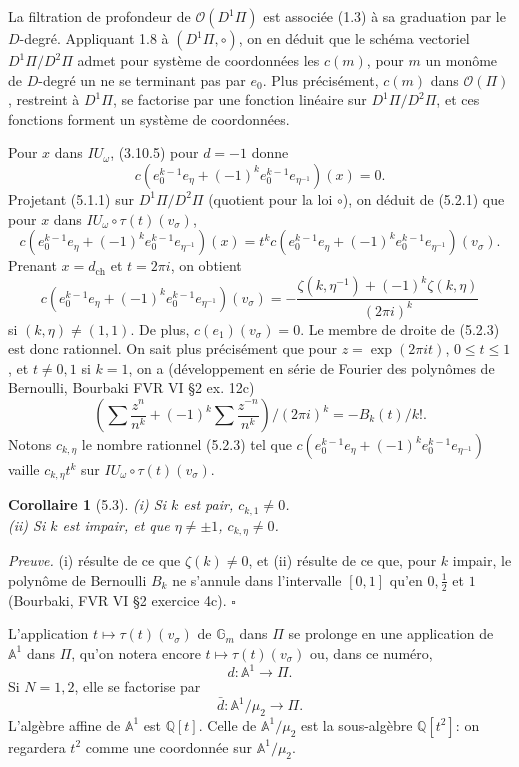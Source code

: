 \documentclass[10pt,a4paper]{article}
\newcommand{\Gm}{\mathbb G_m}
\newcommand{\Q}{\mathbb Q}
\newcommand{\A}{\mathbb A}
\newcommand{\OO}{\mathcal O}
\theoremstyle{deligne}
\newtheorem*{corollary*}{Corollaire}
\newenvironment{proofdel}{\textit{Preuve.}}{\hfill$\square$}
\newcommand{\heading}[1]{\vspace{0.65em}\noindent{\bfseries #1}\quad}
\begin{document}
La filtration de profondeur de \(\OO(D^1\Pi)\) est associée (1.3) à sa graduation par le \(D\)-degré. Appliquant 1.8 à \((D^1\Pi,\circ)\), on en déduit que le schéma vectoriel \(D^1\Pi/D^2\Pi\) admet pour système de coordonnées les \(c(m)\), pour \(m\) un monôme de \(D\)-degré un ne se terminant pas par \(e_0\). Plus précisément, \(c(m)\) dans \(\OO(\Pi)\), restreint à \(D^1\Pi\), se factorise par une fonction linéaire sur \(D^1\Pi/D^2\Pi\), et ces fonctions forment un système de coordonnées.

Pour \(x\) dans \(IU_\omega\), (3.10.5) pour \(d=-1\) donne
\[
\tag{5.2.1}
c(e_0^{k-1}e_\eta+(-1)^ke_0^{k-1}e_{\eta^{-1}})(x)=0.
\]
Projetant (5.1.1) sur \(D^1\Pi/D^2\Pi\) (quotient pour la loi \(\circ\)), on déduit de (5.2.1) que pour \(x\) dans \(IU_\omega\circ\tau(t)(v_\sigma)\),
\[
\tag{5.2.2}
c(e_0^{k-1}e_\eta+(-1)^ke_0^{k-1}e_{\eta^{-1}})(x)
=t^k c(e_0^{k-1}e_\eta+(-1)^ke_0^{k-1}e_{\eta^{-1}})(v_\sigma).
\]
Prenant \(x=d_{\mathrm{ch}}\) et \(t=2\pi i\), on obtient
\[
\tag{5.2.3}
c(e_0^{k-1}e_\eta+(-1)^ke_0^{k-1}e_{\eta^{-1}})(v_\sigma)
=-\frac{\zeta(k,\eta^{-1})+(-1)^k\zeta(k,\eta)}{(2\pi i)^k}
\]
si \((k,\eta)\ne(1,1)\). De plus, \(c(e_1)(v_\sigma)=0\). Le membre de droite de (5.2.3) est donc rationnel. On sait plus précisément que pour \(z=\exp(2\pi it)\), \(0\le t\le1\), et \(t\ne0,1\) si \(k=1\), on a (développement en série de Fourier des polynômes de Bernoulli, Bourbaki FVR VI \S2 ex. 12c)
\[
\tag{5.2.4}
\left(\sum\frac{z^n}{n^k}+(-1)^k\sum\frac{z^{-n}}{n^k}\right)/(2\pi i)^k=-B_k(t)/k!.
\]
Notons \(c_{k,\eta}\) le nombre rationnel (5.2.3) tel que \(c(e_0^{k-1}e_\eta+(-1)^ke_0^{k-1}e_{\eta^{-1}})\) vaille \(c_{k,\eta}t^k\) sur \(IU_\omega\circ\tau(t)(v_\sigma)\).

\begin{corollary*}[5.3]
(i) Si \(k\) est pair, \(c_{k,1}\ne0\).\\
(ii) Si \(k\) est impair, et que \(\eta\ne\pm1\), \(c_{k,\eta}\ne0\).
\end{corollary*}

\begin{proofdel}
(i) résulte de ce que \(\zeta(k)\ne0\), et (ii) résulte de ce que, pour \(k\) impair, le polynôme de Bernoulli \(B_k\) ne s'annule dans l'intervalle \([0,1]\) qu'en \(0,\frac12\) et \(1\) (Bourbaki, FVR VI \S2 exercice 4c).
\end{proofdel}

\heading{5.4.} L'application \(t\mapsto\tau(t)(v_\sigma)\) de \(\Gm\) dans \(\Pi\) se prolonge en une application de \(\A^1\) dans \(\Pi\), qu'on notera encore \(t\mapsto\tau(t)(v_\sigma)\) ou, dans ce numéro,
\[
\tag{5.4.1}
d:\A^1\longrightarrow\Pi.
\]
Si \(N=1,2\), elle se factorise par
\[
\tag{5.4.2}
\bar d:\A^1/\mu_2\longrightarrow\Pi.
\]
L'algèbre affine de \(\A^1\) est \(\Q[t]\). Celle de \(\A^1/\mu_2\) est la sous-algèbre \(\Q[t^2]\): on regardera \(t^2\) comme une coordonnée sur \(\A^1/\mu_2\).
\end{document}
